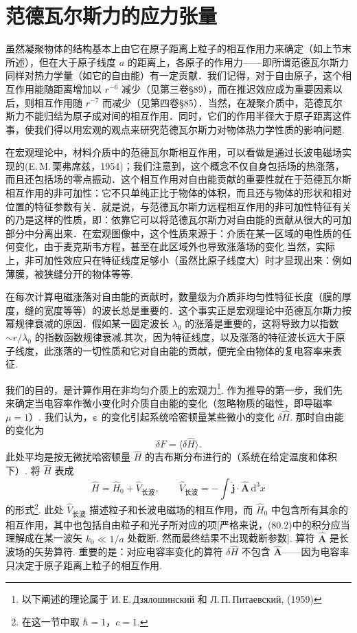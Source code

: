 \section{范德瓦尔斯力的应力张量}

虽然凝聚物体的结构基本上由它在原子距离上粒子的相互作用力来确定（如上节末所述），但在大于原子线度 $a$ 的距离上，各原子的作用力——即所谓范德瓦尔斯力同样对热力学量（如它的自由能）有一定贡献．我们记得，对于自由原子，这个相互作用能随距离增加以 $r^{-6}$ 减少（见第三卷§89），而在推迟效应成为重要因素以后，则相互作用随 $r^{-7}$ 而减少（见第四卷§85）．当然，在凝聚介质中，范德瓦尔斯力不能归结为原子成对间的相互作用．同时，它们的作用半径大于原子距离这件事，使我们得以用宏观的观点来研究范德瓦尔斯力对物体热力学性质的影响问题.

在宏观理论中，材料介质中的范德瓦尔斯相互作用，可以看做是通过长波电磁场实现的(E.\,M.\,栗弗席兹，1954)；我们注意到，这个概念不仅自身包括场的热涨落，而且还包括场的零点振动．这个相互作用对自由能贡献的重要性就在于范德瓦尔斯相互作用的非可加性：它不只单纯正比于物体的体积，而且还与物体的形状和相对位置的特征参数有关．就是说，与范德瓦尔斯力远程相互作用的非可加性特征有关的乃是这样的性质，即：依靠它可以将范德瓦尔斯力对自由能的贡献从很大的可加部分中分离出来．在宏观图像中，这个性质来源于：介质在某一区域的电性质的任何变化，由于麦克斯韦方程，甚至在此区域外也导致涨落场的变化.当然，实际上，非可加性效应只在特征线度足够小（虽然比原子线度大）时才显现出来：例如薄膜，被狭缝分开的物体等等.

在每次计算电磁涨落对自由能的贡献时，数量级为介质非均匀性特征长度（膜的厚度，缝的宽度等等）的波长总是重要的．这个事实正是宏观理论中范德瓦尔斯力按幂规律衰减的原因．假如某一固定波长 $\lambda_0$ 的涨落是重要的，这将导致力以指数 $\sim r/\lambda_0$ 的指数函数规律衰减.其次，因为特征线度，以及涨落的特征波长远大于原子线度，此涨落的一切性质和它对自由能的贡献，便完全由物体的复电容率来表征.

我们的目的，是计算作用在非均匀介质上的宏观力\footnote{以下阐述的理论属于 И.\,Е.\,Дзялошинский 和 Л.\,П.\,Питаевский, (1959)}. 作为推导的第一步，我们先来确定当电容率作微小变化时介质自由能的变化（忽略物质的磁性，即导磁率 $\mu=1$）. 我们认为，$\bm{\varepsilon}$ 的变化引起系统哈密顿量某些微小的变化 $\delta\hat{H}$. 那时自由能的变化为
\begin{equation}
  \delta F=\langle\delta\hat{H}\rangle.
\end{equation}
此处平均是按无微扰哈密顿量 $\hat{H}$ 的吉布斯分布进行的（系统在给定温度和体积
下）. 将 $\hat{H}$ 表成
\begin{equation}
  \hat{H}=\hat{H}_0+\hat{V}_{\text{长波}},\qquad \hat{V}_{\text{长波}}=-\int\hat{\bm{j}}\cdot\hat{\bm{A}}\,\mathrm{d}^{3}x
\end{equation}
的形式\footnote{在这一节中取 $\hbar=1$，$c=1$.}. 此处 $\hat{V}_{\text{长波}}$ 描述粒子和长波电磁场的相互作用，而 $\hat{H}_0$ 中包含所有其余的相互作用，其中也包括自由粒子和光子所对应的项[严格来说，(80.2)中的积分应当理解成在某一波矢 $k_0\ll 1/a$ 处截断. 然而最终结果不出现截断参数]. 算符 $\hat{\bm{A}}$ 是长波场的矢势算符. 重要的是：对应电容率变化的算符 $\delta\hat{H}$ 不包含 $\hat{\bm{A}}$——因为电容率只决定于原子距离上粒子的相互作用.


